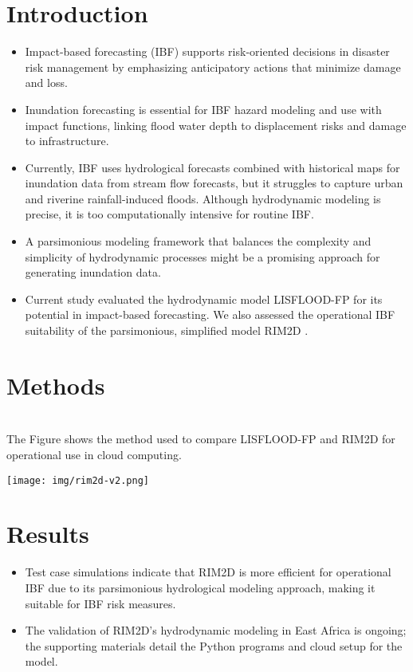 \documentclass[a0paper,fleqn]{betterposter}
\begin{document}
{		\section{Introduction}
		\begin{itemize}
			\item Impact-based forecasting (IBF) supports risk-oriented decisions in disaster risk management by emphasizing anticipatory actions that minimize damage and loss.
			\item Inundation forecasting is essential for IBF hazard modeling and use with impact functions, linking flood water depth to displacement risks and damage to infrastructure.
			\item Currently, IBF uses hydrological forecasts combined with historical maps for inundation data from stream flow forecasts, but it struggles to capture urban and riverine rainfall-induced floods. Although hydrodynamic modeling is precise, it is too computationally intensive for routine IBF.
			\item A parsimonious modeling framework that balances the complexity and simplicity of hydrodynamic processes might be a promising approach for generating inundation data.
			\item Current study evaluated the hydrodynamic model LISFLOOD-FP \cite{sharifian2023lisflood} for its potential in impact-based forecasting. We also assessed the operational IBF suitability of the parsimonious, simplified model RIM2D \cite{apel2022brief}.
			
		\end{itemize}
		
		\section{Methods}
		\\ The Figure shows the method used to compare LISFLOOD-FP and RIM2D for operational use in cloud computing.
		\begin{center}
			\texttt{[image: img/rim2d-v2.png]}
		\end{center}
		
	    \section{Results}
		\begin{itemize}
			\item Test case simulations indicate that RIM2D is more efficient for operational IBF due to its parsimonious hydrological modeling approach, making it suitable for IBF risk measures.
			\item The validation of RIM2D's hydrodynamic modeling in East Africa is ongoing; the supporting materials detail the Python programs and cloud setup for the model.
		\end{itemize}
}
\end{document}
